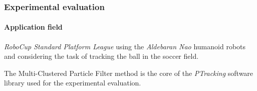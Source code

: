 \begin{frame}
	\frametitle{Experimental evaluation}
	\framesubtitle{Application field}
	
	\vspace{0.5cm}
	
	\emph{RoboCup Standard Platform League} using the \emph{Aldebaran Nao} humanoid robots and considering the task
	of tracking the ball in the soccer field.
	
	\vspace{0.3cm}
	
	The Multi-Clustered Particle Filter method is the core of the \emph{PTracking} software library used for the
	experimental evaluation.
	
	\vspace{0.2cm}
	
	\begin{center}
	\end{center}
\end{frame}

